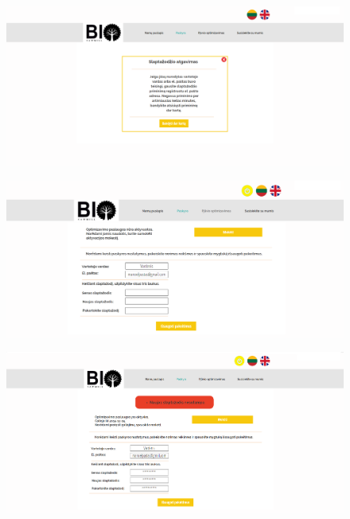 \documentclass[a4paper,12pt]{article}
\begin{document}
\begin{figure}[!tph]
\hspace{-3cm}
\centering
\includegraphics[scale=0.5]{interfeisai/paskyrosPuslapisPamirstasSlaptazodis2}
\label{fig:verticalcell}
\end{figure}


\begin{figure}[!tph]
\hspace{-3cm}
\centering
\includegraphics[scale=0.5]{interfeisai/paskyrosPuslapisVartotojasNeapmoketas}
\label{fig:verticalcell}
\end{figure}

\begin{figure}[!tph]
\hspace{-3cm}
\centering
\includegraphics[scale=0.5]{interfeisai/paskyrosPuslapisVartotojasApmoketas}
\label{fig:verticalcell}
\end{figure}
\end{document}
